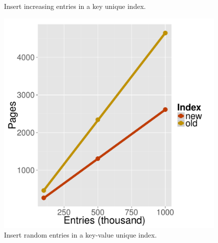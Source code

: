 \documentclass[11pt,a4paper,oneside]{article}
\begin{document}
\begin{figure}[p]
{\begin{minipage}{0.3\textwidth}
      \caption{Insert increasing entries in a key unique index.}
      \label{fig:unique_increasing_insert_numNodes}
      \end{minipage}
      \hspace{0.05\textwidth}
      \begin{minipage}{0.3\textwidth}
      \includegraphics[scale=0.30]{images/nonunique_random_insert_numNodes.pdf} 
      \caption{Insert random entries in a key-value unique index.}
      \label{fig:nonunique_random_insert_numNodes}
      \end{minipage}
    }
\end{figure}
\end{document}
